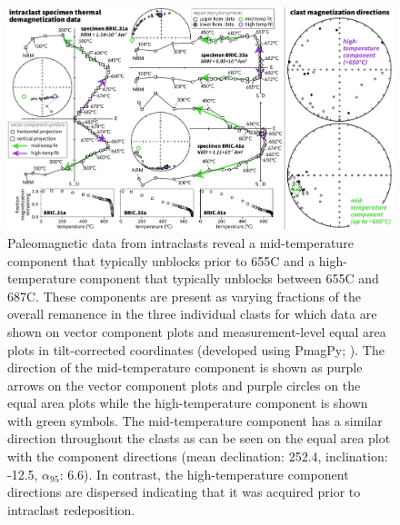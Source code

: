 \documentclass[11pt,letterpaper]{article}
\begin{document}
\begin{figure}[!ht]
\noindent\includegraphics[width=\textwidth]{BRIC_pmag.pdf}
\caption{\small{Paleomagnetic data from intraclasts reveal a mid-temperature component that typically unblocks prior to 655\textdegree C and a high-temperature component that typically unblocks between 655\textdegree C and 687\textdegree C. These components are present as varying fractions of the overall remanence in the three individual clasts for which data are shown on vector component plots and measurement-level equal area plots in tilt-corrected coordinates (developed using PmagPy; \citealp{Tauxe2016a}). The direction of the mid-temperature component is shown as purple arrows on the vector component plots and purple circles on the equal area plots while the high-temperature component is shown with green symbols. The mid-temperature component has a similar direction throughout the clasts as can be seen on the equal area plot with the component directions (mean declination: 252.4, inclination: -12.5, $\alpha_{95}$: 6.6). In contrast, the high-temperature component directions are dispersed indicating that it was acquired prior to intraclast redeposition.}}
\label{fig:intraclast_pmag}
\end{figure}
\end{document}
